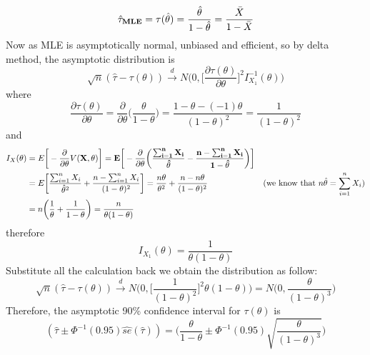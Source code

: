 \documentclass[a4paper,11pt]{article}
\begin{document}
\begin{enumerate}[(a)]
		\[
		\hat{\tau}_{\bf MLE} = \tau(\hat{\theta})= \frac{\hat{\theta}}{1-\hat{\theta}} = \frac{\bar{X}}{1-\bar{X}}
		\]
		Now as MLE is asymptotically normal, unbiased and efficient, so by delta method, the asymptotic distribution is
		\[
		\sqrt{n}(\hat{\tau} - \tau(\theta)) \xrightarrow{d} N\bigg( 0 , \bigg[ \frac{\partial \tau(\theta)}{\partial \theta} \bigg]^2 I_{X_1}^{-1}(\theta)\bigg)
		\]
		where 
		\[
		\frac{\partial \tau(\theta)}{\partial \theta} = \frac{\partial}{\partial \theta} \bigg(  \frac{\theta}{1-\theta} \bigg) = \frac{1-\theta - (-1)\theta}{(1-\theta)^2} = \frac{1}{(1-\theta)^2}
		\]
		and
		\begin{align*}
		I_{X}(\theta) &= E\bigg[-\frac{\partial}{\partial \theta} V(\bf{X},\theta) \bigg] = E\bigg[-\frac{\partial}{\partial \theta} \bigg( \frac{\sum^n_{i=1} X_i}{\hat{\theta}} - \frac{n-\sum^n_{i=1}X_i}{1-\hat{\theta}} \bigg) \bigg]\\ &= E\bigg[ \frac{\sum^n_{i=1} X_i}{\hat{\theta}^2}+\frac{n-\sum^n_{i=1} X_i}{(1-\theta)^2} \bigg] = \frac{n\theta }{\theta^2}+\frac{n-n\theta}{(1-\theta)^2} &  (\mbox{we know that } n\hat{\theta} = \sum^n_{i=1}X_i)\\
		&= n\bigg(\frac{1}{\theta} + \frac{1}{1-\theta}  \bigg) = \frac{n}{\theta(1-\theta)} 
		\end{align*}
		therefore
		\[
		I_{X_1}(\theta) = \frac{1}{\theta(1-\theta)} 
		\]
		Substitute all the calculation back we obtain the distribution as follow:
		\[
		\sqrt{n}(\hat{\tau} - \tau(\theta)) \xrightarrow{d} N\bigg( 0 , \bigg[ \frac{1}{(1-\theta)^2}\bigg]^2 \theta(1-\theta) \bigg)= N\bigg(0, \frac{\theta}{(1-\theta)^3} \bigg) 
		\]
		Therefore, the asymptotic 90\% confidence interval for $\tau(\theta)$ is 
		\[
		(\hat{\tau} \pm \Phi^{-1}(0.95)\hat{se}(\hat{\tau})) =\bigg(\frac{\theta}{1-\theta} \pm \Phi^{-1}(0.95) \sqrt{\frac{\theta}{(1-\theta)^3} } \bigg)
		\]
\end{enumerate}
\end{document}
